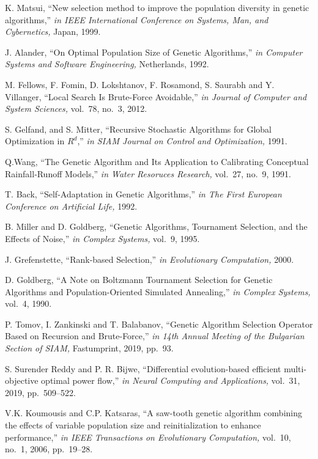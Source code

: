 \documentclass[conference]{IEEEtran}
\begin{document}
\begin{thebibliography}{99}

 K. Matsui, ``New selection method to improve the population diversity in genetic algorithms,'' {\it in IEEE International Conference on Systems, Man, and Cybernetics,} Japan, 1999.

 J. Alander, ``On Optimal Population Size of Genetic Algorithms,'' {\it in Computer Systems and Software Engineering,} Netherlands, 1992.

 M. Fellows, F. Fomin, D. Lokshtanov, F. Rosamond, S. Saurabh and Y. Villanger, ``Local Search Is Brute-Force Avoidable,'' {\it in Journal of Computer and System Sciences,} vol.~78, no.~3, 2012.

 S. Gelfand, and S. Mitter, ``Recursive Stochastic Algorithms for Global Optimization in $R^d$,'' {\it in SIAM Journal on Control and Optimization,} 1991.

 Q.Wang, ``The Genetic Algorithm and Its Application to Calibrating Conceptual Rainfall‐Runoff Models,'' {\it in Water Resoruces Research,} vol.~27, no.~9, 1991.

 T. Back, ``Self-Adaptation in Genetic Algorithms,'' {\it in The First European Conference on Artificial Life,} 1992.

 B. Miller and D. Goldberg, ``Genetic Algorithms, Tournament Selection, and the Effects of Noise,'' {\it in Complex Systems,} vol.~9, 1995.

 J. Grefenstette, ``Rank-based Selection,'' {\it in Evolutionary Computation,} 2000.

 D. Goldberg, ``A Note on Boltzmann Tournament Selection for Genetic Algorithms and Population-Oriented Simulated Annealing,'' {\it in Complex Systems,} vol.~4, 1990.

 P. Tomov, I. Zankinski and T. Balabanov, ``Genetic Algorithm Selection Operator Based on Recursion and Brute-Force,'' {\it in 14th Annual Meeting of the Bulgarian Section of SIAM,} Fastumprint, 2019, pp.~93.

 S. Surender Reddy and P. R. Bijwe, ``Differential evolution-based efficient multi-objective optimal power flow,'' {\it in Neural Computing and Applications,} vol.~31, 2019, pp.~509--522.

 V.K. Koumousis and C.P. Katsaras, ``A saw-tooth genetic algorithm combining the effects of variable population size and reinitialization to enhance performance,'' {\it in IEEE Transactions on Evolutionary Computation,} vol.~10, no.~1, 2006, pp.~19--28.

\end{thebibliography}
\end{document}
